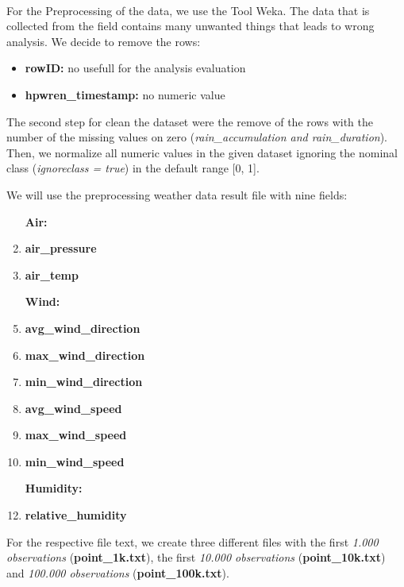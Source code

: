 \documentclass{book}
\begin{document}
    \paragraph{}

    For the Preprocessing of the data, we use the Tool Weka. The data that is collected from the field contains many unwanted things that leads to wrong analysis. We decide to remove the rows:  

    \begin{itemize}
        \item \textbf{rowID:} no usefull for the analysis evaluation
        \item \textbf{hpwren\_timestamp:} no numeric value
    \end{itemize}

    The second step for clean the dataset were the remove of the rows with the number of the missing values on zero (\textit{rain\_accumulation and rain\_duration}). Then, we normalize all numeric values in the given dataset ignoring the nominal class (\textit{ignoreclass = true}) in the default range [0, 1].  

    We will use the preprocessing weather data result file with nine fields:

    \begin{enumerate}
        \item [\textbf{Air:}]
        \item \textbf{air\_pressure}
        \item \textbf{air\_temp}
        \item [\textbf{Wind:}]
        \item \textbf{avg\_wind\_direction}
        \item \textbf{max\_wind\_direction}
        \item \textbf{min\_wind\_direction}
        \item \textbf{avg\_wind\_speed}
        \item \textbf{max\_wind\_speed}
        \item \textbf{min\_wind\_speed}
        \item [\textbf{Humidity:}]
        \item \textbf{relative\_humidity}
    \end{enumerate}

    For the respective file text, we create three different files with the first \textit{1.000 observations} (\textbf{point\_1k.txt}), the first \textit{10.000 observations} (\textbf{point\_10k.txt}) and \textit{100.000 observations} (\textbf{point\_100k.txt}).  
\end{document}
